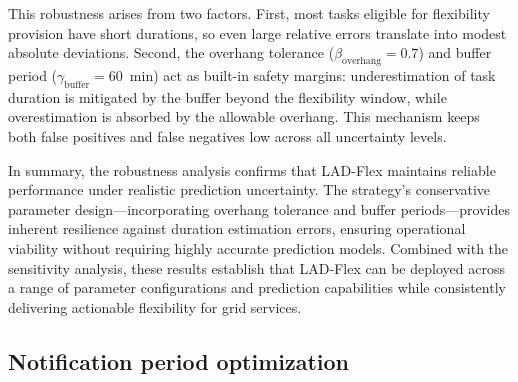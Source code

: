 \documentclass[preprint,12pt]{elsarticle}
\begin{document}
This robustness arises from two factors. First, most tasks eligible for flexibility provision have short durations, so even large relative errors translate into modest absolute deviations. Second, the overhang tolerance ($\beta_{\text{overhang}} = 0.7$) and buffer period ($\gamma_{\text{buffer}} = 60$~min) act as built-in safety margins: underestimation of task duration is mitigated by the buffer beyond the flexibility window, while overestimation is absorbed by the allowable overhang. This mechanism keeps both false positives and false negatives low across all uncertainty levels.

In summary, the robustness analysis confirms that LAD-Flex maintains reliable performance under realistic prediction uncertainty. The strategy's conservative parameter design—incorporating overhang tolerance and buffer periods—provides inherent resilience against duration estimation errors, ensuring operational viability without requiring highly accurate prediction models. Combined with the sensitivity analysis, these results establish that LAD-Flex can be deployed across a range of parameter configurations and prediction capabilities while consistently delivering actionable flexibility for grid services. 





























































\subsection{Notification period optimization} \label{notification_results}
\end{document}

